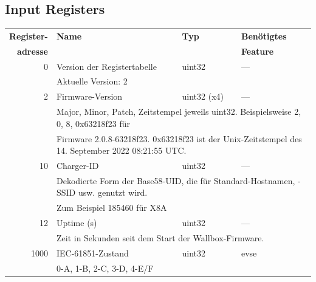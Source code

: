 \documentclass[a4paper,10pt]{article}
\newcommand{\tdesc}[1]{\multicolumn{3}{l}{\footnotesize #1}}
\begin{document}
\subsection*{Input Registers}
\small
\begin{tabularx}{\textwidth}{rXll} \toprule
    \textbf{Register-} & \textbf{Name}& \textbf{Typ} & \textbf{Benötigtes}                                                      \\
    \textbf{adresse}   &              &              & \textbf{Feature}                                                         \\ \midrule
0             & Version der Registertabelle             & uint32       & ---                                     \\
              & \tdesc{Aktuelle Version: 2}                                                                                     \\ \cmidrule{2-4}
2             & Firmware-Version                       & uint32 (x4)       & ---                                                    \\
              & \tdesc{Major, Minor, Patch, Zeitstempel jeweils uint32. Beispielsweise 2, 0, 8, 0x63218f23 für}                 \\
              & \tdesc{Firmware 2.0.8-63218f23. 0x63218f23 ist der Unix-Zeitstempel des 14. September 2022 08:21:55 UTC.}       \\ \cmidrule{2-4}
10            & Charger-ID                              & uint32       & ---                                                    \\
              & \tdesc{Dekodierte Form der Base58-UID, die für Standard-Hostnamen, -SSID usw. genutzt wird.}                    \\
              & \tdesc{Zum Beispiel 185460 für X8A}                                                                             \\ \cmidrule{2-4}
12            & Uptime (s)                              & uint32       & ---                                                    \\
              & \tdesc{Zeit in Sekunden seit dem Start der Wallbox-Firmware.}                                                   \\ \cmidrule{2-4}
1000          & IEC-61851-Zustand                       & uint32       & evse                                                   \\
              & \tdesc{0-A, 1-B, 2-C, 3-D, 4-E/F}                                                                               \\ \cmidrule{2-4}

\end{tabularx}
\end{document}
